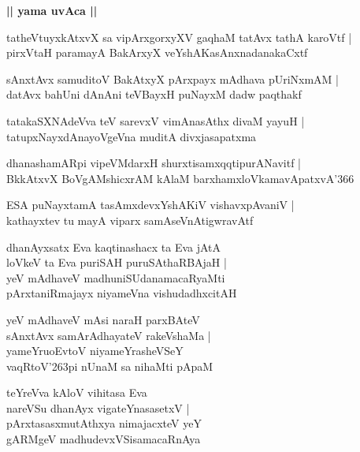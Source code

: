 \documentclass[twoside,12pt,openright]{book}
\def\S{\char'263}
\newcounter{shloka}[chapter]
\def\uvaca#1{\centerline{{\large\textbf{#1}}}}
\begin{document}
\uvaca{|| yama uvAca ||}

\begin{shloka}%
tatheVtuyxkAtxvX sa vipArxgorxyXV gaqhaM tatAvx tathA karoVtf |\\
pirxVtaH paramayA BakArxyX veYshAKasAnxnadanakaCxtf
\end{shloka}

\begin{shloka}%
sAnxtAvx samuditoV BakAtxyX pArxpayx mAdhava pUriNxmAM |\\
datAvx bahUni dAnAni teVBayxH puNayxM dadw paqthakf
\end{shloka}

\begin{shloka}%
tatakaSXNAdeVva teV sarevxV vimAnasAthx divaM yayuH |\\
tatupxNayxdAnayoVgeVna muditA divxjasapatxma 
\end{shloka}

\begin{shloka}%
dhanashamARpi vipeVMdarxH shurxtisamxqqtipurANavitf |\\
BkkAtxvX BoVgAMshicxrAM kAlaM barxhamxloVkamavApatxvA\char'366 
\end{shloka}

\begin{shloka}%
ESA puNayxtamA tasAmxdevxYshAKiV vishavxpAvaniV |\\
kathayxtev tu mayA viparx samAseVnAtigwravAtf
\end{shloka}

\begin{shloka}%
dhanAyxsatx Eva kaqtinashacx ta Eva jAtA \\
loVkeV ta Eva puriSAH puruSAthaRBAjaH |\\
yeV mAdhaveV madhuniSUdanamacaRyaMti \\
pArxtaniRmajayx niyameVna vishudadhxcitAH
\end{shloka}

\begin{shloka}%
yeV mAdhaveV mAsi naraH parxBAteV \\
sAnxtAvx samArAdhayateV rakeVshaMa |\\
yameYruoEvtoV niyameYrasheVSeY \\
vaqRtoV\S pi nUnaM sa nihaMti pApaM 
\end{shloka}

\begin{shloka}%
teYreVva kAloV vihitasa Eva \\
nareVSu dhanAyx vigateYnasasetxV |\\
pArxtasasxmutAthxya nimajacxteV yeY \\
gARMgeV madhudevxVSisamacaRnAya
\end{shloka}
\end{document}
